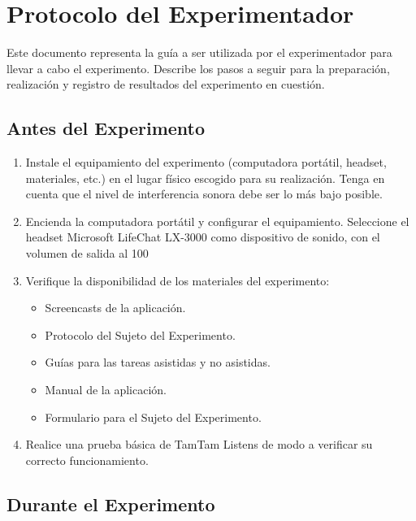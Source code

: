 \section{Protocolo del Experimentador}

Este documento representa la gu\'ia a ser utilizada por el experimentador para llevar a cabo el experimento. 
Describe los pasos a seguir para la preparaci\'on, realizaci\'on y registro de resultados del experimento en cuesti\'on.

\subsection{Antes del Experimento}

\begin{enumerate}
    \item Instale el equipamiento del experimento (computadora port\'atil, headset, materiales, etc.) en el lugar f\'isico escogido para su realizaci\'on. Tenga en cuenta que el nivel de interferencia sonora debe ser lo m\'as bajo posible.
    \item Encienda la computadora port\'atil y configurar el equipamiento. Seleccione el headset Microsoft LifeChat LX-3000 como dispositivo de sonido, con el volumen de salida al 100%
    \item Verifique la disponibilidad de los materiales del experimento:
    \begin{itemize}
        \item Screencasts de la aplicaci\'on.
        \item Protocolo del Sujeto del Experimento.
        \item Gu\'ias para las tareas asistidas y no asistidas.
        \item Manual de la aplicaci\'on.
        \item Formulario para el Sujeto del Experimento.
    \end{itemize}
    \item Realice una prueba b\'asica de TamTam Listens de modo a verificar su correcto funcionamiento. 
\end{enumerate}

\subsection{Durante el Experimento}

